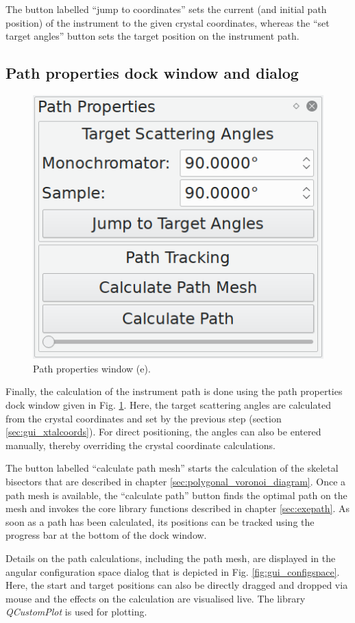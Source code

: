 \begin{minipage}{1 \textwidth}
The button labelled ``jump to coordinates'' sets the current (and initial path position)
of the instrument to the given crystal coordinates, whereas the ``set target angles'' button
sets the target position on the instrument path.

\end{minipage}



\subsection{Path properties dock window and dialog}
\begin{minipage}{1 \textwidth}
\setlength{\intextsep}{0.25cm}
\begin{figure}
	\vspace{-0.25cm}
	\includegraphics[width = 0.25 \textwidth]{figures/gui_path}
	\caption[Path properties window.]{Path properties window (e).
		\label{fig:gui_path}}
\end{figure}

Finally, the calculation of the instrument path is done using the path properties dock window
given in Fig. \ref{fig:gui_path}. Here, the target scattering angles are calculated from the crystal
coordinates and set by the previous step (section \ref{sec:gui_xtalcoords}). For direct positioning,
the angles can also be entered manually, thereby overriding the crystal coordinate calculations.

The button labelled ``calculate path mesh'' starts the calculation of the skeletal bisectors that are
described in chapter \ref{sec:polygonal_voronoi_diagram}.
Once a path mesh is available, the ``calculate path'' button finds the optimal path on the mesh and 
invokes the core library functions described in chapter \ref{sec:exepath}.
As soon as a path has been calculated, its positions can be tracked using the progress bar at the bottom
of the dock window.

Details on the path calculations, including the path mesh, are displayed in the angular configuration
space dialog that is depicted in Fig. \ref{fig:gui_configspace}.
Here, the start and target positions can also be directly dragged and dropped via mouse and the
effects on the calculation are visualised live.
The library \textit{QCustomPlot} \cite{web_QCustomPlot} is used for plotting.

\end{minipage}




